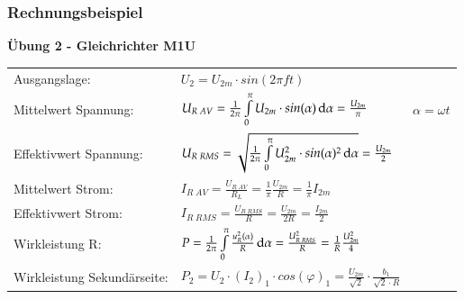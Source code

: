 \subsubsection{Rechnungsbeispiel}
\textbf{Übung 2 - Gleichrichter M1U}\newline
\renewcommand{\arraystretch}{1.3}
\begin{tabular}{ p{}  p{}  p{}}
    Ausgangslage:&
    $ U_2= U_{2m}\cdot sin(2\pi ft)$&
    \\
    Mittelwert Spannung: &
    $ U_{R \; AV}= \frac{1}{2 \pi} \int\limits_{0}^{\pi} U_{2m}\cdot sin(\alpha)\mathop{}\!\mathrm{d}\alpha=\frac{U_{2m}}{\pi} $ &
    $ \alpha=\omega t $
    \\
    
    Effektivwert Spannung:   &
    $ U_{R \; RMS}= \sqrt{\frac{1}{2 \pi}\int\limits_{0}^{\pi} U_{2m}^2\cdot sin(\alpha)^2\mathop{}\!\mathrm{d}\alpha} = \frac{U_{2m}}{2} $ &
    \\ 
    
    Mittelwert Strom: &
    $ I_{R \; AV}=\frac{U_{R \; AV}}{R_L}= \frac{1}{\pi}\frac{U_{2m}}{R}= \frac{1}{\pi} I_{2m} $ &
    \\
    
    Effektivwert Strom: &
    $ I_{R \; RMS}=\frac{U_{R \; RMS}}{R}= \frac{U_{2m}}{2R}= \frac{I_{2m}}{2} $ &
    \\
    
    Wirkleistung R: &
    $ P= \frac{1}{2\pi}\int\limits_{0}^{\pi}\frac{u_R^2(\alpha)}{R} \mathop{}\!\mathrm{d} \alpha = \frac{U_{R \; RMS}^2}{R}=\frac{1}{R}\frac{U_{2m}^2}{4} $&
    \\
    
    Wirkleistung Sekundärseite: &
    $P_2 = U_2 \cdot (I_2)_1 \cdot cos(\varphi)_1 = \frac{U_{2m}}{\sqrt{2}} \cdot \frac{b_1}{\sqrt{2} \cdot R}$&
    \\
\end{tabular}\vspace*{-1cm}
\renewcommand{\arraystretch}{1}

\clearpage


